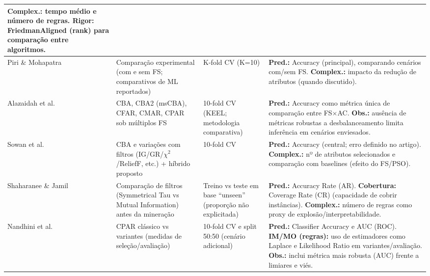 \begin{table}[H]
\begin{tabularx}{\textwidth}{|p{3.1cm}|p{3.7cm}|p{2.2cm}|X|}
\textbf{Complex.:} tempo médio e número de regras.
\textbf{Rigor:} FriedmanAligned (rank) para comparação entre algoritmos. \\
\hline
Piri \& Mohapatra \cite{piri2019exploring} &
Comparação experimental (com e sem FS; comparativos de ML reportados) &
K-fold CV (K=10) &
\textbf{Pred.:} Accuracy (principal), comparando cenários com/sem FS.
\textbf{Complex.:} impacto da redução de atributos (quando discutido). \\
\hline
Alazaidah et al. \cite{alazaidah2021feature} &
CBA, CBA2 (msCBA), CFAR, CMAR, CPAR sob múltiplos FS &
10-fold CV (KEEL; metodologia comparativa) &
\textbf{Pred.:} Accuracy como métrica única de comparação entre FS$\times$AC.
\textbf{Obs.:} ausência de métricas robustas a desbalanceamento limita inferência em cenários enviesados. \\
\hline
Sowan et al. \cite{sowan2023hybrid} &
CBA e variações com filtros (IG/GR/$\chi^2$/ReliefF, etc.) + híbrido proposto &
10-fold CV &
\textbf{Pred.:} Accuracy (central; erro definido no artigo).
\textbf{Complex.:} nº de atributos selecionados e comparação com baselines (efeito do FS/PSO). \\
\hline
Shaharanee \& Jamil \cite{shaharanee2015irrelevant} &
Comparação de filtros (Symmetrical Tau vs Mutual Information) antes da mineração &
Treino vs teste em base ``unseen'' (proporção não explicitada) &
\textbf{Pred.:} Accuracy Rate (AR).
\textbf{Cobertura:} Coverage Rate (CR) (capacidade de cobrir instâncias).
\textbf{Complex.:} número de regras como proxy de explosão/interpretabilidade. \\
\hline
Nandhini et al. \cite{nandhini2020performance} &
CPAR clássico vs variantes (medidas de seleção/avaliação) &
10-fold CV e split 50:50 (cenário adicional) &
\textbf{Pred.:} Classifier Accuracy e AUC (ROC).
\textbf{IM/MO (regras):} uso de estimadores como Laplace e Likelihood Ratio em variantes/avaliação.
\textbf{Obs.:} inclui métrica mais robusta (AUC) frente a limiares e viés. \\
\hline
\end{tabularx}
\end{table}

